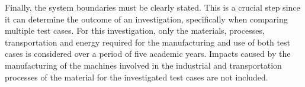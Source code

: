 Finally, the system boundaries must be clearly stated. This is a crucial step since it can determine the outcome of an investigation, specifically when comparing multiple test cases. For this investigation, only the materials, processes, transportation and energy required for the manufacturing and use of both test cases is considered over a period of five academic years. Impacts caused by the manufacturing of the machines involved in the industrial and transportation processes of the material for the investigated test cases are not included.